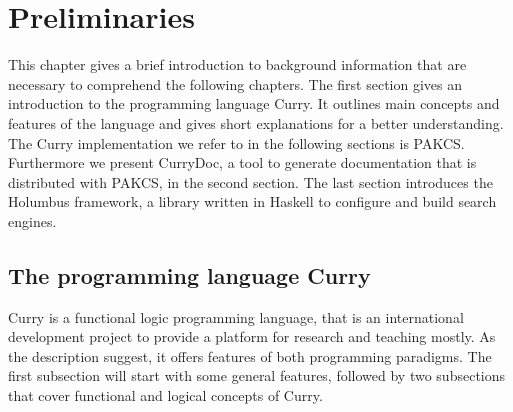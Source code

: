 \documentclass[%
	pdftex,%
	a4paper,%
	oneside,%
	chapterprefix,%
	headsepline,%
	12pt%
]{scrbook}
\begin{document}
\chapter{Preliminaries}\label{preliminaries}
This chapter gives a brief introduction to background information
that are necessary to comprehend the following chapters. The first
section gives an introduction to the programming language Curry. It
outlines main concepts and features of the language and gives short
explanations for a better understanding. The Curry implementation we
refer to in the following sections is PAKCS\cite{pakcs}. Furthermore
we present CurryDoc\cite{currydoc}, a tool to generate documentation
that is distributed with PAKCS, in the second section. The last
section introduces the Holumbus\cite{holumbus} framework, a library
written in Haskell to configure and build search engines.

\section{The programming language Curry}\label{preliminaries:curry}


Curry is a functional logic programming language, that is an
international development project to provide a platform for research
and teaching mostly. As the description suggest, it offers features of
both programming paradigms. The first subsection will start with some general
features, followed by two subsections that cover
functional and logical concepts of Curry.

\end{document}
